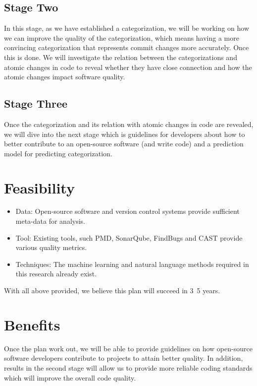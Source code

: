 \documentclass[10pt,conference]{IEEEtran}
\begin{document}
\subsection{Stage Two}
In this stage, as we have established a categorization, we will be working on how we can improve the quality of the categorization, which means having a more convincing categorization that represents commit changes more accurately. Once this is done. We will investigate the relation between the categorizations and atomic changes in code to reveal whether they have close connection and how the atomic changes impact software quality.

\subsection{Stage Three}
Once the categorization and its relation with atomic changes in code are revealed, we will dive into the next stage which is guidelines for developers about how to better contribute to an open-source software (and write code) and a prediction model for predicting categorization.

\section{Feasibility}
\begin{itemize}
    \item Data: Open-source software and version control systems provide sufficient meta-data for analysis.
    \item Tool: Existing tools, such PMD, SonarQube, FindBugs and CAST provide various quality metrics.
    \item Techniques: The machine learning and natural language methods required in this research already exist.
\end{itemize}
With all above provided, we believe this plan will succeed in 3~5 years.

\section{Benefits}

Once the plan work out, we will be able to provide guidelines on how open-source software developers contribute to projects to attain better quality. 
In addition, results in the second stage will allow us to provide more reliable coding standards which will improve the overall code quality.
\end{document}
